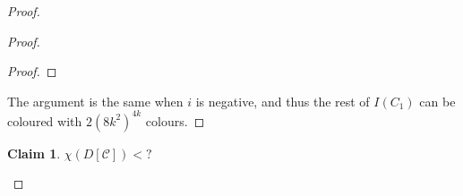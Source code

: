 \documentclass[utf8,10pt]{article}
\theoremstyle{plain}
\newtheorem{claim}{Claim}[theorem]
\theoremstyle{definition}
\theoremstyle{remark}
\begin{document}
\begin{proof}
\begin{proof}
\begin{proof}
\end{proof}
%
%

The argument is the same when $i$ is negative, and thus the rest of $I(C_1)$ can be coloured with $2(8k^2)^{4k}$ colours.
\end{proof}



\begin{claim}\label{DC}
$\chi(D[\mathcal{C}]) < ? $
\end{claim}




\end{proof}
\end{document}
